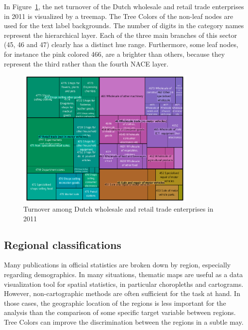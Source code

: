 \documentclass[journal]{vgtc}                %
\begin{document}

In Figure~\ref{fig:treemapApp}, the net turnover of the Dutch wholesale and retail trade enterprises in 2011 is visualized by a treemap. The Tree Colors of the non-leaf nodes are used for the text label backgrounds. The number of digits in the category names represent the hierarchical layer. Each of the three main branches of this sector (45, 46 and 47) clearly has a distinct hue range. Furthermore, some leaf nodes, for instance the pink colored 466, are a brighter than others, because they represent the third rather than the fourth NACE layer.

\begin{figure}[!t]
  \centering
  \includegraphics[width=3.5in]{TMbusiness.pdf}
  \caption{Turnover among Dutch wholesale and retail trade enterprises in 2011}\label{fig:treemapApp}
\end{figure}

\subsection{Regional classifications}
Many publications in official statistics are broken down by region, especially regarding demographics.
In many situations, thematic maps are useful as a data visualization tool for spatial statistics, in particular choropleths and cartograms. However, non-cartographic methods are often sufficient for the task at hand. In those cases, the geographic location of the regions is less important for the analysis than the comparison of some specific target variable between regions. Tree Colors can improve the discrimination between the regions in a subtle may.
\end{document}
